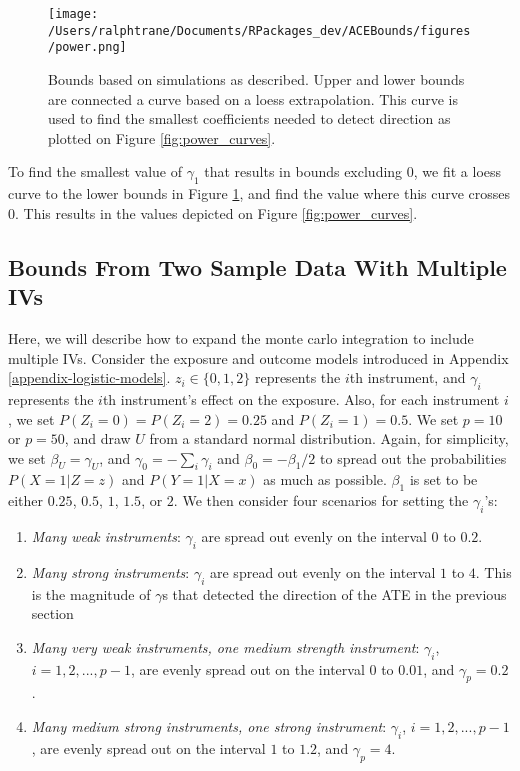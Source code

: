\documentclass[
]{article}
\theoremstyle{plain}
\begin{document}
\begin{figure}[H]
  \centering
  \texttt{[image: /Users/ralphtrane/Documents/RPackages\_dev/ACEBounds/figures/power.png]}
  \caption{Bounds based on simulations as described. Upper and lower bounds are connected a curve based on a loess extrapolation. This curve is used to find the smallest coefficients needed to detect direction as plotted on Figure \ref{fig:power_curves}.}
  \label{fig:power}
\end{figure}

To find the smallest value of \(\gamma_1\) that results in bounds excluding \(0\), we fit a loess curve to the lower bounds in Figure \ref{fig:power}, and find the value where this curve crosses \(0\). This results in the values depicted on Figure \ref{fig:power_curves}.

\hypertarget{bounds-from-two-sample-data-with-multiple-ivs}{%
\subsection{\texorpdfstring{Bounds From Two Sample Data With Multiple IVs \label{appendix-sim-results-multiple-IVs}}{Bounds From Two Sample Data With Multiple IVs }}\label{bounds-from-two-sample-data-with-multiple-ivs}}

Here, we will describe how to expand the monte carlo integration to include multiple IVs. Consider the exposure and outcome models introduced in Appendix \ref{appendix-logistic-models}. \(z_i \in \{0,1,2\}\) represents the \(i\)th instrument, and \(\gamma_i\) represents the \(i\)th instrument's effect on the exposure. Also, for each instrument \(i\), we set \(P(Z_i = 0) = P(Z_i = 2) = 0.25\) and \(P(Z_i = 1) = 0.5\). We set \(p = 10\) or \(p = 50\), and draw \(U\) from a standard normal distribution. Again, for simplicity, we set \(\beta_U = \gamma_U\), and \(\gamma_0 = -\sum_i \gamma_i\) and \(\beta_0 = -\beta_1/2\) to spread out the probabilities \(P(X = 1 | Z = z)\) and \(P(Y = 1 | X = x)\) as much as possible. \(\beta_1\) is set to be either \(0.25\), \(0.5\), \(1\), \(1.5\), or \(2\). We then consider four scenarios for setting the \(\gamma_i\)'s:

\begin{enumerate}
\item \emph{Many weak instruments}: \(\gamma_i\) are spread out evenly on the interval \(0\) to \(0.2\).
\item \emph{Many strong instruments}: \(\gamma_i\) are spread out evenly on the interval \(1\) to \(4\). This is the magnitude of $\gamma$s that detected the direction of the ATE in the previous section
\item \emph{Many very weak instruments, one medium strength instrument}: $\gamma_i$, $i=1,2,...,p-1$, are evenly spread out on the interval $0$ to $0.01$, and $\gamma_p = 0.2$. 
\item \emph{Many medium strong instruments, one strong instrument}: $\gamma_i$, $i=1,2,...,p-1$, are evenly spread out on the interval $1$ to $1.2$, and $\gamma_p = 4$.
\end{enumerate}
\end{document}
